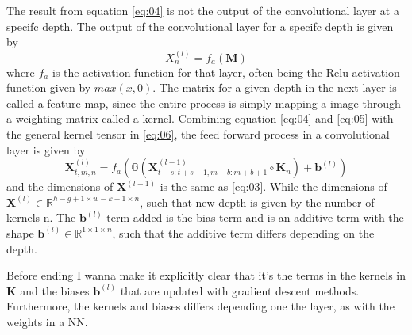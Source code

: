 \documentclass[%
 uio,
 jmp,
 amsmath,amssymb,
 reprint, nofootinbib]{revtex4-1}
\numberwithin{equation}{section}
\newcommand{\lp}{\left(}
\newcommand{\rp}{\right)}
\begin{document}
The result from equation \ref{eq:04} is not the output of the convolutional layer at a specifc depth. The output of the convolutional layer for a specifc depth is given by
\begin{equation}\label{eq:05}
X^{(l)}_n = f_a(\bm{M})
\end{equation}
where \(f_a\) is the activation function for that layer, often being the Relu activation function given by \(max(x, 0)\). The matrix for a given depth in the next layer is called a feature map, since the entire process is simply mapping a image through a weighting matrix called a kernel. Combining equation \ref{eq:04} and \ref{eq:05} with the general kernel tensor in \ref{eq:06}, the feed forward process in a convolutional layer is given by
\begin{equation}\label{eq:07}
\bm{X}^{(l)}_{t, m, n} = f_a\lp \mathbb{G}\lp\bm{X}^{(l-1)}_{t - s:t + s + 1, m - b:m + b + 1}\circ \bm{K}_{n}\rp + \bm{b}^{(l)}\rp 
\end{equation}
and the dimensions of \(\bm{X}^{(l-1)}\) is the same as \ref{eq:03}. While the dimensions of \(\bm{X}^{(l)} \in\mathbb{R}^{h - g + 1\times w - k + 1\times n}\), such that new depth is given by the number of kernels n. The \(\bm{b}^{(l)}\) term added is the bias term and is an additive term with the shape \(\bm{b}^{(l)}\in \mathbb{R}^{1\times 1\times n}\), such that the additive term differs depending on the depth.

Before ending I wanna make it explicitly clear that it's the terms in the kernels in \(\bm{K}\) and the biases \(\bm{b}^{(l)}\) that are updated with gradient descent methods. Furthermore, the kernels and biases differs depending one the layer, as with the weights in a NN.
\end{document}
